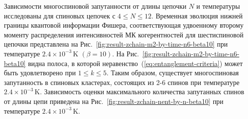 
Зависимости многоспиновой запутанности от длины цепочки $N$ и температуры исследованы для спиновых цепочек с $4\leqslant N \leqslant 12$.
Временная эволюция нижней границы квантовой информации Фишера,
соответствующая  удвоенному второму моменту распределения интенсивностей МК когерентностей для шестиспиновой цепочки представлена на Рис.~\ref{fig:result-zchain-m2-by-time-n6-beta10} при температуре $2.4\times 10^{-3}\,\mbox{K}$ $(\beta=10)$.
На Рис.~\ref{fig:result-zchain-m2-by-time-n6-beta10} видна полоса,
в которой неравенство~(\ref{eq:entanglement-criteria}) может быть удовлетворено при $1\leqslant k \leqslant 5$.
Таким образом, существует многоспиновая запутанность в спиновых кластерах, состоящих из 2-6 спинов при температуре $2.4\times 10^{-3}\,\mbox{K}$.
Зависимость оценки максимального количества запутанных спинов от длины цепи приведена на Рис.~\ref{fig:result-zchain-nent-by-n-beta10} при температуре $2.4\times 10^{-3}\,\mbox{K}$.

